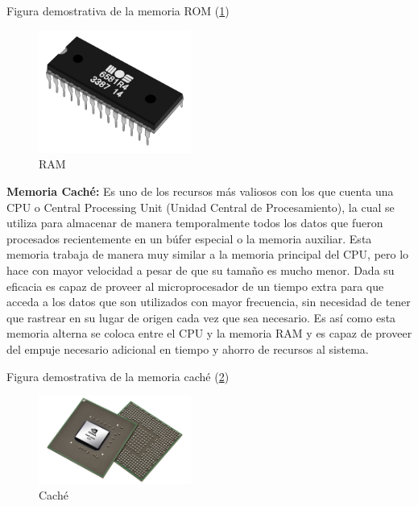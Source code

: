 \documentclass{article}
\begin{document}
Figura demostrativa de la memoria ROM (\ref{fig_rom})\newline

\begin{figure}[h]
\includegraphics[width=5cm]{rom.png}
\centering
\caption{RAM}
\label{fig_rom}
\end{figure}

\textbf{Memoria Caché:}
Es uno de los recursos más valiosos con los que cuenta una CPU o Central Processing Unit (Unidad Central de Procesamiento), la cual se utiliza para almacenar de manera temporalmente todos los datos que fueron procesados recientemente en un búfer especial o la memoria auxiliar.\newline
Esta memoria trabaja de manera muy similar a la memoria principal del CPU, pero lo hace con mayor velocidad a pesar de que su tamaño es mucho menor. Dada su eficacia es capaz de proveer al microprocesador de un tiempo extra para que acceda a los datos que son utilizados con mayor frecuencia, sin necesidad de tener que rastrear en su lugar de origen cada vez que sea necesario.\newline
Es así como esta memoria alterna se coloca entre el CPU y la memoria RAM y es capaz de proveer del empuje necesario adicional en tiempo y ahorro de recursos al sistema.\newline

Figura demostrativa de la memoria caché (\ref{fig_cache})\newline

\begin{figure}[h]
\includegraphics[width=5cm]{cache.png}
\centering
\caption{Caché}
\label{fig_cache}
\end{figure}
\end{document}
